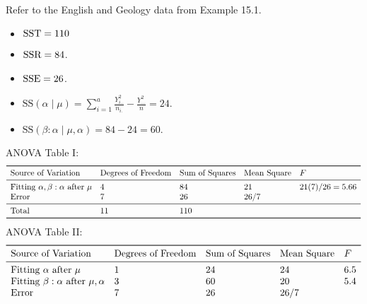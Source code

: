 \begin{Example}{}{}
    Refer to the English and Geology data from Example 15.1.
    \begin{itemize}
        \item $ \text{SST}=110 $
        \item $ \text{SSR}=84 $.
        \item $ \text{SSE}=26 $.
        \item $ \displaystyle\text{SS}(\alpha\mid \mu)=\sum_{i=1}^{a}\frac{Y_{i..}^2}{n_{i.}}-\frac{Y_{...}^2}{n}=24 $.
        \item $ \text{SS}(\beta:\alpha\mid \mu,\alpha)=84-24=60 $.
    \end{itemize}
    ANOVA Table I\@:
    \[ \begin{array}{lllll}
            \toprule
            \text{Source of Variation}                          & \text{Degrees of Freedom} & \text{Sum of Squares} & \text{Mean Square} & F             \\
            \midrule
            \text{Fitting }\alpha,\beta:\alpha\text{ after }\mu & 4                         & 84                    & 21                 & 21(7)/26=5.66 \\
            \text{Error}                                        & 7                         & 26                    & 26/7                               \\
            \midrule
            \text{Total}                                        & 11                        & 110                                                        \\
            \bottomrule
        \end{array} \]
    ANOVA Table II\@:
    \[ \begin{array}{lllll}
            \toprule
            \text{Source of Variation}                          & \text{Degrees of Freedom} & \text{Sum of Squares} & \text{Mean Square} & F   \\
            \midrule
            \text{Fitting }\alpha\text{ after }\mu              & 1                         & 24                    & 24                 & 6.5 \\
            \text{Fitting }\beta:\alpha\text{ after }\mu,\alpha & 3                         & 60                    & 20                 & 5.4 \\
            \text{Error}                                        & 7                         & 26                    & 26/7                     \\

\end{array}\]
\end{Example}

